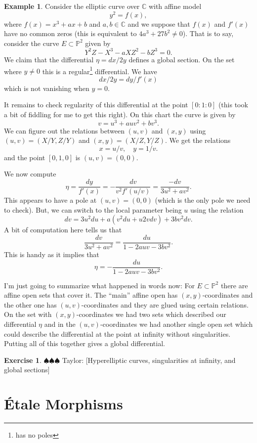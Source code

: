 \documentclass[12pt]{article}
\numberwithin{equation}{section}
\theoremstyle{definition}
\newtheorem{example}[theorem]{Example}
\newtheorem{exercise}[theorem]{Exercise}
\theoremstyle{remark}
\newcommand{\CC}{\mathbb{C}}
\newcommand{\PP}{\mathbb{P}}
\newcommand{\taylor}[1]{{\color{blue} \sf $\spadesuit\spadesuit\spadesuit$ Taylor: [#1]}}
\begin{document}
\begin{example}
	Consider the elliptic curve over $\CC$ with affine model
	 $$ y^2 = f(x), $$
	where $f(x)=x^3+ax+b$ and $a,b\in \CC$ and we suppose that $f(x)$ and $f'(x)$ have no common zeros (this is equivalent to $4a^3+27b^2\neq 0$).
	That is to say, consider the curve $E \subset \PP^2$ given by
	 $$ Y^2Z - X^3-aXZ^2-bZ^3=0. $$
	We claim that the differential $\eta=dx/2y$ defines a global section.
	On the set where $y\neq 0$ this is a regular\footnote{has no poles} differential.
	We have $$dx/2y=dy/f'(x)$$ 
	which is not vanishing when $y=0$. 
	
	It remains to check regularity of this differential at the point $[0:1:0]$ (this took a bit of fiddling for me to get this right).
	On this chart the curve is given by 
	$$v=u^3+auv^2+bv^3.$$ 
	We can figure out the relations between $(u,v)$ and $(x,y)$ using $(u,v) = (X/Y,Z/Y)$ and $(x,y)=(X/Z,Y/Z)$. 
	We get the relations
	$$ x=u/v, \quad y = 1/v.$$
	and the point  $[0,1,0]$ is $(u,v)=(0,0)$. 
	
	We now compute 
	 $$ \eta = \frac{dy}{f'(x)} = -\dfrac{dv}{v^2f'(u/v)} = \frac{-dv}{3u^2+av^2}.$$
	This appears to have a pole at $(u,v)=(0,0)$ (which is the only pole we need to check). 
	But, we can switch to the local parameter being $u$ using the relation
	 $$dv = 3u^2du+a (v^2du+ u 2vdv) + 3bv^2dv.$$
	 A bit of computation here tells us that  
	 $$\dfrac{dv}{3u^2+av^2} = \dfrac{du}{1-2auv-3bv^2}.$$
	This is handy as it implies that 
	 $$ \eta = -\dfrac{du}{1-2auv-3bv^2}.$$
	 
	 I'm just going to summarize what happened in words now:
	 For $E \subset \PP^2$ there are affine open sets that cover it. 
	 The ``main'' affine open has $(x,y)$-coordinates and the other one has $(u,v)$-coordinates and they are glued using certain relations. 
	 On the set with $(x,y)$-coordinates we had two sets which described our differential $\eta$ and in the $(u,v)$-coordinates we had another single open set which could describe the differential at the point at infinity without singularities.
	 Putting all of this together gives a global differential.
\end{example}


\begin{exercise}
\taylor{Hyperelliptic curves, singularities at infinity, and global sections}
\end{exercise}

\section{\'Etale Morphisms}\label{sec:etale}
\end{document}
